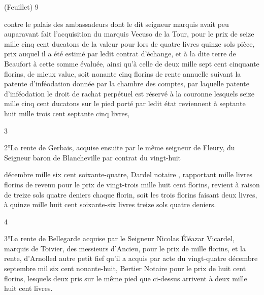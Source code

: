 \documentclass[a4paper,twoside,openany]{article}
\begin{document}

\begin{flushright}
(Feuillet) 9
\end{flushright}		
contre le palais des ambassadeurs dont le dit
seigneur marquis avait peu auparavant fait
l’acquisition du marquis Vecuso de la Tour,
pour le prix de seize mille cinq cent ducatons
de la valeur pour lors de quatre livres quinze
sols pièce, prix auquel il a été estimé par ledit
contrat d’échange, et à la dite terre de Beaufort
à cette somme évaluée, ainsi qu’à celle de
deux mille sept cent cinquante florins, de
mieux value, soit nonante cinq florins de
rente annuelle suivant la patente d’inféodation
donnée par la chambre des comptes, par laquelle
patente d’inféodation le droit de rachat
perpétuel est réservé à la couronne lesquels
seize mille cinq cent ducatons sur le pied
porté par ledit état reviennent à septante 
huit mille trois cent septante cinq livres,

\begin{center}
3
\end{center}
2°La rente de Gerbais, acquise ensuite par le
même seigneur de Fleury, du Seigneur baron
de Blancheville 
 par contrat du vingt-huit


décembre mille six cent soixante-quatre, Dardel 
notaire 
, rapportant mille livres florins de revenu 
pour le prix de vingt-trois mille huit cent florins, 
revient à raison de treize sols quatre deniers 
chaque florin, soit les trois florins faisant deux 
livres, à quinze mille huit cent soixante-six 
livres treize sols quatre deniers.

\begin{center}
4
\end{center}
3°La rente de Bellegarde acquise par le Seigneur
 Nicolas Éléazar Vicardel, marquis de Toivier, des
 messieurs d’Ancieu, pour le prix de mille florins, et
 la rente, d’Arnolled autre petit fief qu’il a acquis
 par acte du vingt-quatre décembre septembre
 mil six cent nonante-huit, Bertier Notaire  pour le prix
 de huit cent florins, lesquels deux pris
sur le même pied que ci-dessus arrivent à 
deux mille huit cent livres.
\end{document}
